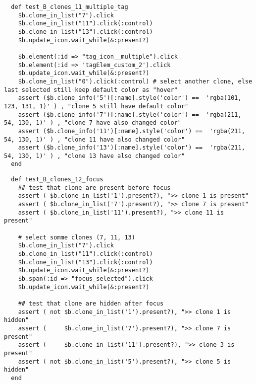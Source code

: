 \begin{verbatim}
  def test_B_clones_11_multiple_tag
    $b.clone_in_list("7").click
    $b.clone_in_list("11").click(:control)
    $b.clone_in_list("13").click(:control)
    $b.update_icon.wait_while(&:present?)

    $b.element(:id => "tag_icon__multiple").click
    $b.element(:id => 'tagElem_custom_2').click
    $b.update_icon.wait_while(&:present?)
    $b.clone_in_list("0").click(:control) # select another clone, else last selected still keep default color as "hover"
    assert ($b.clone_info('5')[:name].style('color') ==  'rgba(101, 123, 131, 1)' ) , "clone 5 still have default color"
    assert ($b.clone_info('7')[:name].style('color') ==  'rgba(211, 54, 130, 1)' ) , "clone 7 have also changed color"
    assert ($b.clone_info('11')[:name].style('color') ==  'rgba(211, 54, 130, 1)' ) , "clone 11 have also changed color"
    assert ($b.clone_info('13')[:name].style('color') ==  'rgba(211, 54, 130, 1)' ) , "clone 13 have also changed color"
  end
\end{verbatim}

\begin{verbatim}
  def test_B_clones_12_focus
    ## test that clone are present before focus
    assert ( $b.clone_in_list('1').present?), ">> clone 1 is present"
    assert ( $b.clone_in_list('7').present?), ">> clone 7 is present"
    assert ( $b.clone_in_list('11').present?), ">> clone 11 is present"
    
    # select somme clones (7, 11, 13)
    $b.clone_in_list("7").click
    $b.clone_in_list("11").click(:control)
    $b.clone_in_list("13").click(:control)
    $b.update_icon.wait_while(&:present?)
    $b.span(:id => "focus_selected").click
    $b.update_icon.wait_while(&:present?)

    ## test that clone are hidden after focus
    assert ( not $b.clone_in_list('1').present?), ">> clone 1 is hidden"
    assert (     $b.clone_in_list('7').present?), ">> clone 7 is present"
    assert (     $b.clone_in_list('11').present?), ">> clone 3 is present"
    assert ( not $b.clone_in_list('5').present?), ">> clone 5 is hidden"
  end
\end{verbatim}

